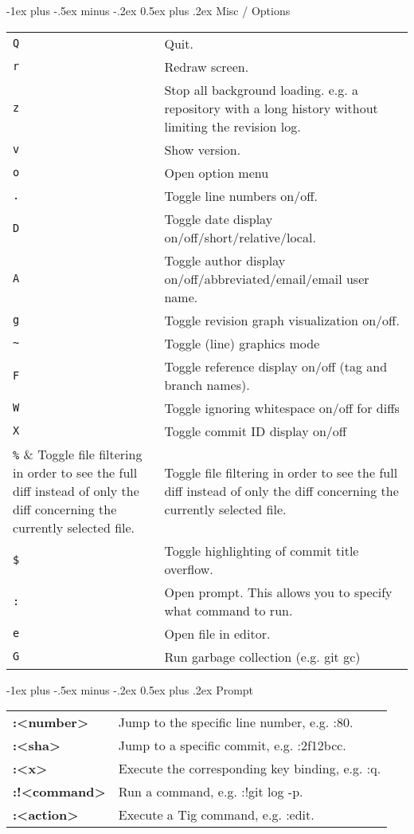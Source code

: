 \documentclass[10pt,landscape]{article}
\makeatletter
\renewcommand{\section}{\@startsection{section}{1}{0mm}%
                                {-1ex plus -.5ex minus -.2ex}%
                                {0.5ex plus .2ex}%
                                {\normalfont\large\bfseries}}
\makeatother
\begin{document}
\begin{multicols}{3}
\section{Misc / Options}
\begin{tabular}{@{}lp{7cm}@{}}
\verb!Q! & Quit. \\
\verb!r! & Redraw screen. \\
\verb!z! & Stop all background loading. e.g. a repository with a long history without limiting the revision log. \\
\verb!v! & Show version. \\
\verb!o! & Open option menu \\
\verb!.! & Toggle line numbers on/off. \\
\verb!D! & Toggle date display on/off/short/relative/local. \\
\verb!A! & Toggle author display on/off/abbreviated/email/email user name. \\
\verb!g! & Toggle revision graph visualization on/off. \\
\verb!~! & Toggle (line) graphics mode \\
\verb!F! & Toggle reference display on/off (tag and branch names). \\
\verb!W! & Toggle ignoring whitespace on/off for diffs \\
\verb!X! & Toggle commit ID display on/off \\
\verb!%! & Toggle file filtering in order to see the full diff instead of only the diff concerning the currently selected file. \\
\verb!$! & Toggle highlighting of commit title overflow. \\
\verb!:! & Open prompt. This allows you to specify what command to run. \\
\verb!e! & Open file in editor. \\
\verb!G! & Run garbage collection (e.g. git gc) \\
\end{tabular}

\section{Prompt}
\begin{tabular}{@{}ll@{}}
\textbf{:\textless number\textgreater} & Jump to the specific line number, e.g. :80. \\
\textbf{:\textless sha\textgreater} & Jump to a specific commit, e.g. :2f12bcc. \\
\textbf{:\textless x\textgreater} & Execute the corresponding key binding, e.g. :q. \\
\textbf{:!\textless command\textgreater} & Run a command, e.g. :!git log -p. \\
\textbf{:\textless action\textgreater} & Execute a Tig command, e.g. :edit. \\
\end{tabular}



\end{multicols}
\end{document}
